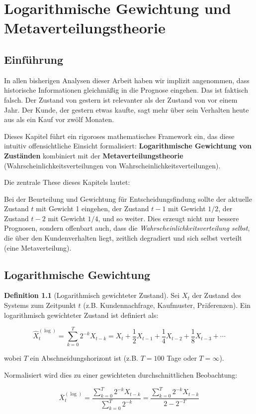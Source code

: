 \documentclass[12pt, a4paper, titlepage]{report}
\theoremstyle{definition}
\newtheorem{definition}[theorem]{Definition}
\theoremstyle{remark}
\begin{document}
\chapter{Logarithmische Gewichtung und Metaverteilungstheorie}
\label{sec:logarithmic_weighting}

\section{Einführung}

In allen bisherigen Analysen dieser Arbeit haben wir implizit angenommen, dass historische Informationen gleichmäßig in die Prognose eingehen. Das ist faktisch falsch. Der Zustand von gestern ist relevanter als der Zustand von vor einem Jahr. Der Kunde, der gestern etwas kaufte, sagt mehr über sein Verhalten heute aus als ein Kauf vor zwölf Monaten.

Dieses Kapitel führt ein rigoroses mathematisches Framework ein, das diese intuitiv offensichtliche Einsicht formalisiert: \textbf{Logarithmische Gewichtung von Zuständen} kombiniert mit der \textbf{Metaverteilungstheorie} (Wahrscheinlichkeitsverteilungen von Wahrscheinlichkeitsverteilungen).

Die zentrale These dieses Kapitels lautet:

Bei der Beurteilung und Gewichtung für Entscheidungsfindung sollte der aktuelle Zustand $t$ mit Gewicht 1 eingehen, der Zustand $t-1$ mit Gewicht $1/2$, der Zustand $t-2$ mit Gewicht $1/4$, und so weiter. Dies erzeugt nicht nur bessere Prognosen, sondern offenbart auch, dass die \emph{Wahrscheinlichkeitsverteilung selbst}, die über den Kundenverhalten liegt, zeitlich degradiert und sich selbst verteilt (eine Metaverteilung).

\section{Logarithmische Gewichtung}

\begin{definition}[Logarithmisch gewichteter Zustand]
Sei $X_t$ der Zustand des Systems zum Zeitpunkt $t$ (z.B. Kundennachfrage, Kaufmuster, Präferenzen). Ein logarithmisch gewichteter Zustand ist definiert als:

\begin{equation}
\hat{X}_t^{(\log)} = \sum_{k=0}^{T} 2^{-k} X_{t-k} = X_t + \frac{1}{2} X_{t-1} + \frac{1}{4} X_{t-2} + \frac{1}{8} X_{t-3} + \cdots
\label{eq:log_weighted_state}
\end{equation}

wobei $T$ ein Abschneidungshorizont ist (z.B. $T = 100$ Tage oder $T = \infty$).

Normalisiert wird dies zu einer gewichteten durchschnittlichen Beobachtung:

\begin{equation}
\bar{X}_t^{(\log)} = \frac{\sum_{k=0}^{T} 2^{-k} X_{t-k}}{\sum_{k=0}^{T} 2^{-k}} = \frac{\sum_{k=0}^{T} 2^{-k} X_{t-k}}{2 - 2^{-T}}
\label{eq:normalized_log_weighted}
\end{equation}
\end{definition}
\end{document}
